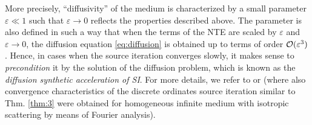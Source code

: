More precisely, 
``diffusivity'' of the medium is characterized by a small parameter $\varepsilon \ll 1$ such that $\varepsilon\to 0$ 
reflects the properties described above. The parameter is also defined in such a way that when the terms of the NTE are 
scaled by $\varepsilon$ and $\varepsilon \to 0$, the diffusion equation \eqref{eq:diffusion} is obtained up to terms of
order $\mathcal{O}(\varepsilon^3)$. Hence, in cases when the source iteration converges slowly, it makes sense to 
\textit{precondition} it by the solution of the diffusion problem, which is known as the \textit{diffusion synthetic
acceleration of SI}. For more details, we refer to \cite[Chap. 1]{Azmy1} or \cite[Sec. III]{Adams} (where also
convergence characteristics of the discrete ordinates source iteration similar to Thm. \ref{thm:3} were obtained for
homogeneous infinite medium with isotropic scattering by means of Fourier analysis).



